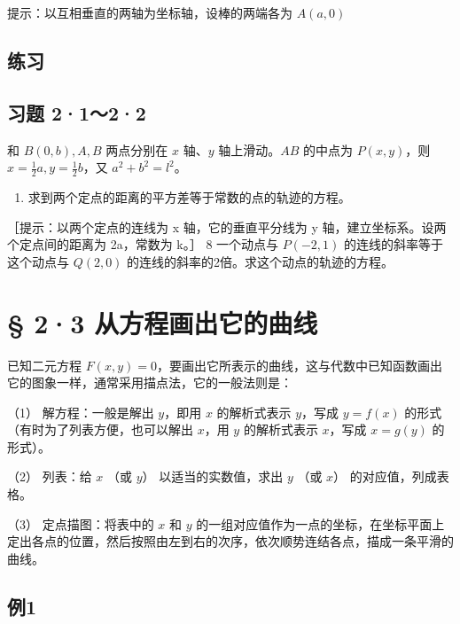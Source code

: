 提示：以互相垂直的两轴为坐标轴，设棒的两端各为 \(A(a,0)\)

\subsection{练习}\label{ux7ec3ux4e60-2}

\subsection{习题 2·1～2·2}\label{ux4e60ux9898-2122}

和 \(B(0, b), A, B\) 两点分别在 \(x\) 轴、\(y\) 轴上滑动。\(AB\)
的中点为 \(P(x, y)\)，则 \(x = \frac{1}{2} a, y = \frac{1}{2} b\)，又
\(a^2 + b^2 = l^2\)。

\begin{enumerate}
\def\labelenumi{\arabic{enumi}.}
\setcounter{enumi}{6}
\tightlist
\item
  求到两个定点的距离的平方差等于常数的点的轨迹的方程。
\end{enumerate}

［提示：以两个定点的连线为 x 轴，它的垂直平分线为 y
轴，建立坐标系。设两个定点间的距离为 2a，常数为 k。］ 8 一个动点与
\(P(-2, 1)\) 的连线的斜率等于这个动点与 \(Q(2, 0)\)
的连线的斜率的2倍。求这个动点的轨迹的方程。

\section{§ 2·3
从方程画出它的曲线}\label{ux4eceux65b9ux7a0bux753bux51faux5b83ux7684ux66f2ux7ebf}

已知二元方程
\(F(x, y) = 0\)，要画出它所表示的曲线，这与代数中已知函数画出它的图象一样，通常采用描点法，它的一般法则是：

（1） 解方程：一般是解出 \(y\)，即用 \(x\) 的解析式表示 \(y\)，写成
\(y = f(x)\) 的形式（有时为了列表方便，也可以解出 \(x\)，用 \(y\)
的解析式表示 \(x\)，写成 \(x = g(y)\) 的形式）。

（2） 列表：给 \(x\) （或 \(y\)） 以适当的实数值，求出 \(y\) （或
\(x\)） 的对应值，列成表格。

（3） 定点描图：将表中的 \(x\) 和 \(y\)
的一组对应值作为一点的坐标，在坐标平面上定出各点的位置，然后按照由左到右的次序，依次顺势连结各点，描成一条平滑的曲线。

\subsection{例1}\label{ux4f8b1-9}


